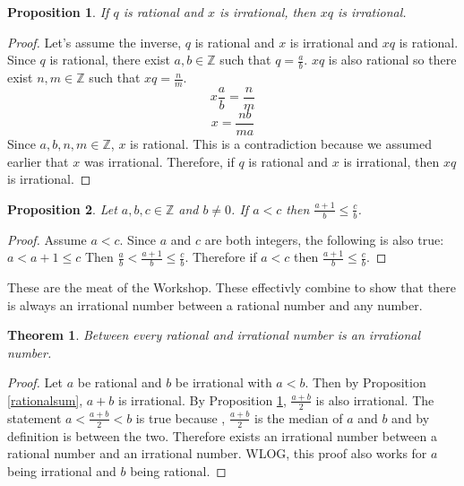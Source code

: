 \documentclass{article}
\newtheorem{theorem}{Theorem}
\newtheorem{prop}{Proposition}
\begin{document}
\begin{prop} \label{rationalproduct}
If $q$ is rational and $x$ is irrational, then $xq$ is irrational.
\end{prop}
\begin{proof}
Let's assume the inverse, $q$ is rational and $x$ is irrational and $xq$ is rational. Since $q$ is rational, there exist $a,b\in\mathbb{Z}$ such that $q=\frac{a}{b}$. $xq$ is also rational so there exist $n,m\in\mathbb{Z}$ such that $xq=\frac{n}{m}$.
$$x\frac{a}{b}=\frac{n}{m}$$
$$x=\frac{nb}{ma}$$
Since $a,b,n,m\in\mathbb{Z}$, $x$ is rational. This is a contradiction because we assumed earlier that $x$ was irrational.
Therefore, if $q$ is rational and $x$ is irrational, then $xq$ is irrational.
\end{proof}

\begin{prop}
Let $a,b,c\in\mathbb{Z}$ and $b\neq0$. If $a<c$ then $\frac{a+1}{b}\leq\frac{c}{b}$.
\end{prop}
\begin{proof}
Assume $a<c$. Since $a$ and $c$ are both integers, the following is also true: $a<a+1\leq c$ Then $\frac{a}{b}<\frac{a+1}{b}\leq\frac{c}{b}$. Therefore if $a<c$ then $\frac{a+1}{b}\leq\frac{c}{b}$.
\end{proof}

\vspace{5mm}

These are the meat of the Workshop. These effectivly combine to show that there is always an irrational number between a rational number and any number.

\vspace{5mm}

\begin{theorem}\label{betweenirrationalandrational}
Between every rational and irrational number is an irrational number.
\end{theorem} 
\begin{proof}
Let $a$ be rational and $b$ be irrational with $a<b$. Then by Proposition \ref{rationalsum}, $a+b$ is irrational. By Proposition \ref{rationalproduct}, $\frac{a+b}{2}$ is also irrational. The statement $a<\frac{a+b}{2}<b$ is true because , $\frac{a+b}{2}$ is the median of $a$ and $b$ and by definition is between the two. Therefore exists an irrational number between a rational number and an irrational number. WLOG, this proof also works for $a$ being irrational and $b$ being rational.
\end{proof}
\end{document}
